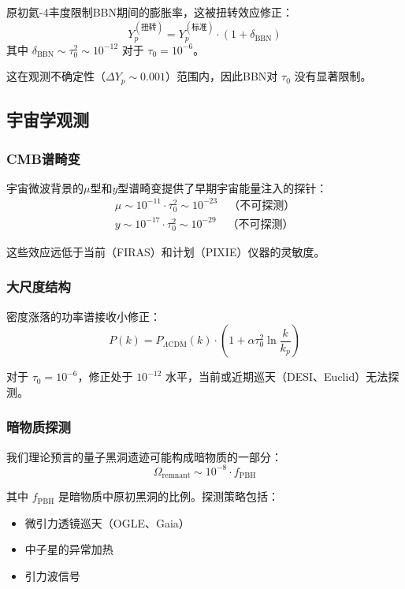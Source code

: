 原初氦-4丰度限制BBN期间的膨胀率，这被扭转效应修正：
\begin{equation}
    Y_p^{(\text{扭转})} = Y_p^{(\text{标准})} \cdot (1 + \delta_{\text{BBN}})
\end{equation}
其中 $\delta_{\text{BBN}} \sim \tau_0^2 \sim 10^{-12}$ 对于 $\tau_0 = 10^{-6}$。

这在观测不确定性（$\Delta Y_p \sim 0.001$）范围内，因此BBN对 $\tau_0$ 没有显著限制。

\subsection{宇宙学观测}

\subsubsection{CMB谱畸变}

宇宙微波背景的$\mu$型和$y$型谱畸变提供了早期宇宙能量注入的探针：
\begin{align}
    \mu \sim 10^{-11} \cdot \tau_0^2 \sim 10^{-23} \quad \text{（不可探测）} \\
    y \sim 10^{-17} \cdot \tau_0^2 \sim 10^{-29} \quad \text{（不可探测）}
\end{align}

这些效应远低于当前（FIRAS）和计划（PIXIE）仪器的灵敏度。

\subsubsection{大尺度结构}

密度涨落的功率谱接收小修正：
\begin{equation}
    P(k) = P_{\Lambda \text{CDM}}(k) \cdot \left(1 + \alpha \tau_0^2 \ln\frac{k}{k_p}\right)
\end{equation}

对于 $\tau_0 = 10^{-6}$，修正处于 $10^{-12}$ 水平，当前或近期巡天（DESI、Euclid）无法探测。

\subsubsection{暗物质探测}

我们理论预言的量子黑洞遗迹可能构成暗物质的一部分：
\begin{equation}
    \Omega_{\text{remnant}} \sim 10^{-8} \cdot f_{\text{PBH}}
\end{equation}

其中 $f_{\text{PBH}}$ 是暗物质中原初黑洞的比例。探测策略包括：
\begin{itemize}
    \item 微引力透镜巡天（OGLE、Gaia）
    \item 中子星的异常加热
    \item 引力波信号
\end{itemize}

